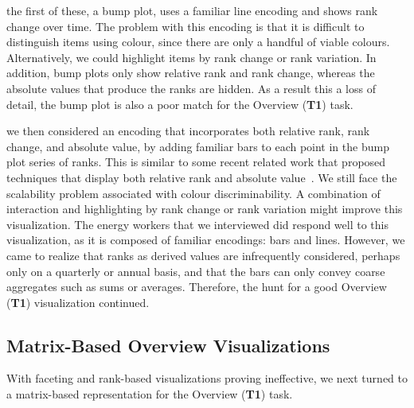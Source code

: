 \documentclass[journal]{vgtc}                %
\newcommand{\bstart}[1]{\vspace{1mm} \noindent{\textbf{#1:}}}
\begin{document}
\bstart{Bump plots} the first of these, a bump plot, uses a familiar line encoding and shows rank change over time. 
The problem with this encoding is that it is difficult to distinguish items using colour, since there are only a handful of viable colours. 
Alternatively, we could highlight items by rank change or rank variation.
In addition, bump plots only show relative rank and rank change, whereas the absolute values that produce the ranks are hidden. 
As a result this a loss of detail, the bump plot is also a poor match for the Overview ({\bf T1}) task.

\bstart{Bump + bar plots} we then considered an encoding that incorporates both relative rank, rank change, and absolute value, by adding familiar bars to each point in the bump plot series of ranks. 
This is similar to some recent related work that proposed techniques that display both relative rank and absolute value~\cite{Gratzl2013,Hur2013}. 
We still face the scalability problem associated with colour discriminability. 
A combination of interaction and highlighting by rank change or rank variation might improve this visualization.
The energy workers that we interviewed did respond well to this visualization, as it is composed of familiar encodings: bars and lines. 
However, we came to realize that ranks as derived values are infrequently considered, perhaps only on a quarterly or annual basis, and that the bars can only convey coarse aggregates such as sums or averages. 
Therefore, the hunt for a good Overview ({\bf T1}) visualization continued.


\subsection{Matrix-Based Overview Visualizations}
\label{design-matrix}


With faceting and rank-based visualizations proving ineffective, we next turned to a matrix-based representation for the Overview ({\bf T1}) task.
\end{document}
